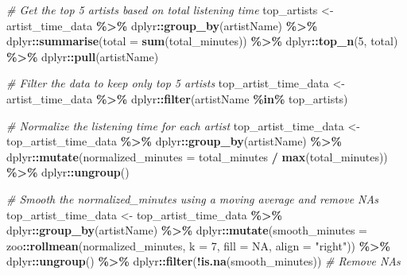 \documentclass[
]{article}
\newenvironment{Shaded}{\begin{snugshade}}{\end{snugshade}}
\newcommand{\AttributeTok}[1]{\textcolor[rgb]{0.13,0.29,0.53}{#1}}
\newcommand{\CommentTok}[1]{\textcolor[rgb]{0.56,0.35,0.01}{\textit{#1}}}
\newcommand{\ConstantTok}[1]{\textcolor[rgb]{0.56,0.35,0.01}{#1}}
\newcommand{\DecValTok}[1]{\textcolor[rgb]{0.00,0.00,0.81}{#1}}
\newcommand{\FunctionTok}[1]{\textcolor[rgb]{0.13,0.29,0.53}{\textbf{#1}}}
\newcommand{\NormalTok}[1]{#1}
\newcommand{\OtherTok}[1]{\textcolor[rgb]{0.56,0.35,0.01}{#1}}
\newcommand{\SpecialCharTok}[1]{\textcolor[rgb]{0.81,0.36,0.00}{\textbf{#1}}}
\newcommand{\StringTok}[1]{\textcolor[rgb]{0.31,0.60,0.02}{#1}}
\begin{document}
\begin{Shaded}
\begin{Highlighting}[]
\CommentTok{\# Get the top 5 artists based on total listening time}
\NormalTok{top\_artists }\OtherTok{\textless{}{-}}\NormalTok{ artist\_time\_data }\SpecialCharTok{\%\textgreater{}\%}
\NormalTok{  dplyr}\SpecialCharTok{::}\FunctionTok{group\_by}\NormalTok{(artistName) }\SpecialCharTok{\%\textgreater{}\%}
\NormalTok{  dplyr}\SpecialCharTok{::}\FunctionTok{summarise}\NormalTok{(}\AttributeTok{total =} \FunctionTok{sum}\NormalTok{(total\_minutes)) }\SpecialCharTok{\%\textgreater{}\%}
\NormalTok{  dplyr}\SpecialCharTok{::}\FunctionTok{top\_n}\NormalTok{(}\DecValTok{5}\NormalTok{, total) }\SpecialCharTok{\%\textgreater{}\%}
\NormalTok{  dplyr}\SpecialCharTok{::}\FunctionTok{pull}\NormalTok{(artistName)}

\CommentTok{\# Filter the data to keep only top 5 artists}
\NormalTok{top\_artist\_time\_data }\OtherTok{\textless{}{-}}\NormalTok{ artist\_time\_data }\SpecialCharTok{\%\textgreater{}\%}
\NormalTok{  dplyr}\SpecialCharTok{::}\FunctionTok{filter}\NormalTok{(artistName }\SpecialCharTok{\%in\%}\NormalTok{ top\_artists)}

\CommentTok{\# Normalize the listening time for each artist}
\NormalTok{top\_artist\_time\_data }\OtherTok{\textless{}{-}}\NormalTok{ top\_artist\_time\_data }\SpecialCharTok{\%\textgreater{}\%}
\NormalTok{  dplyr}\SpecialCharTok{::}\FunctionTok{group\_by}\NormalTok{(artistName) }\SpecialCharTok{\%\textgreater{}\%}
\NormalTok{  dplyr}\SpecialCharTok{::}\FunctionTok{mutate}\NormalTok{(}\AttributeTok{normalized\_minutes =}\NormalTok{ total\_minutes }\SpecialCharTok{/} \FunctionTok{max}\NormalTok{(total\_minutes)) }\SpecialCharTok{\%\textgreater{}\%}
\NormalTok{  dplyr}\SpecialCharTok{::}\FunctionTok{ungroup}\NormalTok{()}

\CommentTok{\# Smooth the normalized\_minutes using a moving average and remove NAs}
\NormalTok{top\_artist\_time\_data }\OtherTok{\textless{}{-}}\NormalTok{ top\_artist\_time\_data }\SpecialCharTok{\%\textgreater{}\%}
\NormalTok{  dplyr}\SpecialCharTok{::}\FunctionTok{group\_by}\NormalTok{(artistName) }\SpecialCharTok{\%\textgreater{}\%}
\NormalTok{  dplyr}\SpecialCharTok{::}\FunctionTok{mutate}\NormalTok{(}\AttributeTok{smooth\_minutes =}\NormalTok{ zoo}\SpecialCharTok{::}\FunctionTok{rollmean}\NormalTok{(normalized\_minutes, }\AttributeTok{k =} \DecValTok{7}\NormalTok{, }\AttributeTok{fill =} \ConstantTok{NA}\NormalTok{, }\AttributeTok{align =} \StringTok{"right"}\NormalTok{)) }\SpecialCharTok{\%\textgreater{}\%}
\NormalTok{  dplyr}\SpecialCharTok{::}\FunctionTok{ungroup}\NormalTok{() }\SpecialCharTok{\%\textgreater{}\%}
\NormalTok{  dplyr}\SpecialCharTok{::}\FunctionTok{filter}\NormalTok{(}\SpecialCharTok{!}\FunctionTok{is.na}\NormalTok{(smooth\_minutes))  }\CommentTok{\# Remove NAs}


\end{Highlighting}
\end{Shaded}
\end{document}
